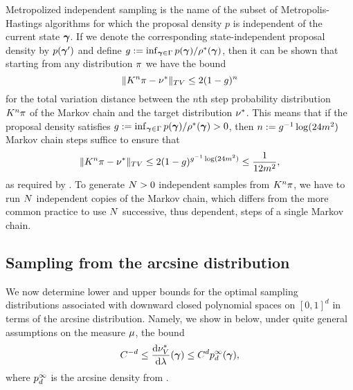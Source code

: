 Metropolized independent sampling is the name of the subset of Metropolis-Hastings algorithms for which the proposal density $p$ is independent of the current state $\bm{\gamma}$. If we denote the corresponding state-independent proposal density by $p(\bm{\gamma}')$ %
and define $g:=\inf_{\bm{\gamma}\in\Gamma}p(\bm{\gamma})/\rho^{*}(\bm{\gamma})$, then it can be shown \cite[Section 3.2.2]{liu1996metropolized} that starting from any distribution $\pi$ we have the bound
\begin{equation}
\label{eq:TV}
\|K^{n}\pi-\nu^{*}\|_{TV}\leq 2 (1-g)^n
\end{equation} for the total variation distance between the $n$th step probability distribution $K^n\pi$ of the Markov chain and the target distribution $\nu^{*}$.
This means that if the proposal  density satisfies $g:=\inf_{\bm{\gamma}\in\Gamma}p(\bm{\gamma})/\rho^{*}(\bm{\gamma})>0$, then $n:= g^{-1}\log(24m^2)$ Markov chain steps suffice to ensure that
\begin{equation*}
\|K^n\pi-\nu^{*}\|_{TV}\leq 2 (1-g)^{g^{-1}\log(24m^2)}\leq \frac{1}{12m^2},
\end{equation*}
as required by . To generate $N>0$ independent samples from $K^{n}\pi$, we have to run $N$ independent copies of the Markov chain, which differs from the more common practice to use $N$ successive, thus dependent, steps of a single Markov chain.

\subsection{Sampling from the arcsine distribution}
\label{ssec:arcsine}
We now determine lower and upper bounds for the optimal sampling distributions associated with downward closed polynomial spaces on $[0,1]^d$ in terms of the arcsine distribution. Namely, we show in  below, under quite general assumptions on the measure $\mu$, the bound
\begin{equation*}
	C^{-d}\leq \frac{\text{\textup{d}}\nu^{*}_{V}}{\text{\textup{d}}\lambda}(\bm{\gamma})\leq C^dp^{\infty}_{d}(\bm{\gamma}),
\end{equation*}
where $p^{\infty}_d$ is the arcsine density from .


